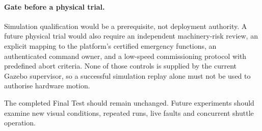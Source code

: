 \paragraph{Gate before a physical trial.}
Simulation qualification would be a prerequisite, not deployment authority. A
future physical trial would also require an independent machinery-risk review,
an explicit mapping to the platform's certified emergency functions, an
authenticated command owner, and a low-speed commissioning protocol with
predefined abort criteria. None of those controls is supplied by the current
Gazebo supervisor, so a successful simulation replay alone must not be used to
authorise hardware motion.

The completed Final Test should remain unchanged. Future experiments should
examine new visual conditions, repeated runs, live faults and concurrent shuttle
operation.

